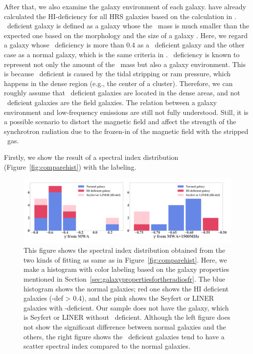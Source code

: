 After that, we also examine the galaxy environment of each galaxy.
\citet{Boselli2014} have already calculated the HI-deficiency for all HRS galaxies based on the calculation in \citet{Boselli2009}.
\nh~deficient galaxy is defined as a galaxy whose the \nh~mass is much smaller than the expected one based on the morphology and the size of a galaxy \citep{Haynes1984}.
Here, we regard a galaxy whose \nh~deficiency is more than 0.4 as a \nh~deficient galaxy and the other case as a normal galaxy, which is the same criteria in \citet{Ciesla2016}.
\nh~deficiency is known to represent not only the amount of the \nh~mass but also a galaxy environment.
This is because \nh~deficient is caused by the tidal stripping or ram pressure, which happens in the dense region (e.g., the center of a cluster).
Therefore, we can roughly assume that \nh~deficient galaxies are located in the dense areas, and not \nh~deficient galaxies are the field galaxies.
The relation between a galaxy environment and low-frequency emissions are still not fully understood.
Still, it is a possible scenario to distort the magnetic field and affect the strength of the synchrotron radiation due to the frozen-in of the magnetic field with the stripped \nh~gas.

Firstly, we show the result of a spectral index distribution (Figure~\ref{fig:comparehist}) with the labeling.

\begin{figure}[htbp]
	\centering
	\includegraphics[width=\linewidth]{Chapter_6/Figures/Discuss_comparehist.pdf}
    \caption[Histograms of $\gamma$ from the fitting (labeled)]{\label{fig:comparehist_h1def}
        This figure shows the spectral index distribution obtained from the two kinds of fitting as same as in Figure~\ref{fig:comparehist}.
        Here, we make a histogram with color labeling based on the galaxy properties mentioned in Section~\ref{sec:galaxypropertiesfortheradiosfr}.
        The blue histogram shows the normal galaxies; red one shows the HI deficient galaxies (\nh-def > 0.4), and the pink shows the Seyfert or LINER galaxies with \nh-deficient.
        Our sample does not have the galaxy, which is Seyfert or LINER without \nh~deficient.
        Although the left figure does not show the significant difference between normal galaxies and the others, the right figure shows the \nh~deficient galaxies tend to have a scatter spectral index compared to the normal galaxies.
    }
\end{figure}


